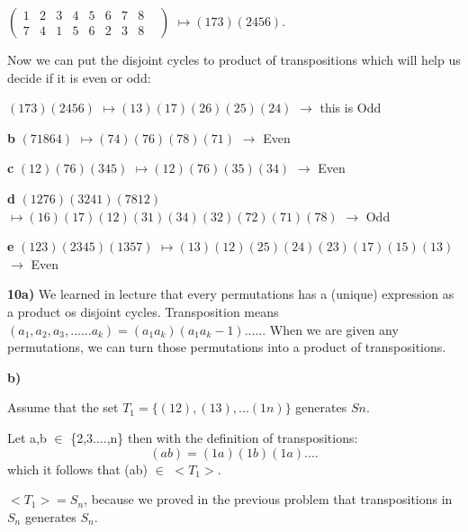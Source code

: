 \documentclass{article}
\begin{document}
\begin{center}
$(\begin{smallmatrix}
1 & 2 & 3 & 4 & 5 & 6 & 7 & 8 & \\
7 & 4 & 1 & 5 & 6 & 2 & 3 & 8 &
\end{smallmatrix})$		$\mapsto(173)(2456)$.
\end{center}

\medskip

Now we can put the disjoint cycles to product of transpositions which will help us decide if it is even or odd:

\medskip
$(173)(2456)$		$\mapsto(13)(17)(26)(25)(24)$   $\longrightarrow$ this is Odd


\medskip
\bigskip


\hspace{.2in}\textbf{b} \hspace{.1in} $(71864)$		$\mapsto(74)(76)(78)(71)$	$\longrightarrow$  Even

\medskip

\hspace{.2in}\textbf{c} \hspace{.1in} $(12)(76)(345)$	 $\mapsto(12)(76)(35)(34)$ 		$\longrightarrow$ Even

\medskip

\hspace{.2in}\textbf{d} \hspace{.1in}  $(1276)(3241)(7812)$ 		$\mapsto (16)(17)(12)(31)(34)(32)(72)(71)(78)$		$\longrightarrow$ Odd

\medskip

\hspace{.2in}\textbf{e} \hspace{.1in} $(123)(2345)(1357)$  	$\mapsto (13)(12)(25)(24)(23)(17)(15)(13)$ $\longrightarrow$ Even

\medskip


\newpage


\textbf{10a)} We learned in lecture that every permutations has a (unique) expression as a product os disjoint cycles. 
Transposition means $(a_1, a_2, a_3,......a_k)=(a_1a_k)(a_1a_k-1).....$. When we are given any permutations, we can turn those permutations into a product of transpositions.

\bigskip

\textbf{b)}

Assume that the set $T_1=\{(12),(13), . . . (1n)\} $ generates  $Sn.$

 Let a,b $\in$ \{2,3....,n\}
 then with the definition of transpositions: $$(ab)=(1a)(1b)(1a)....$$
 which it follows that (ab) $\in$  $<T_1>$.
 
 $<T_1>=S_n$, because we proved in the previous problem that transpositions in $S_n$ generates $S_n$.
 





					   
\end{document}
